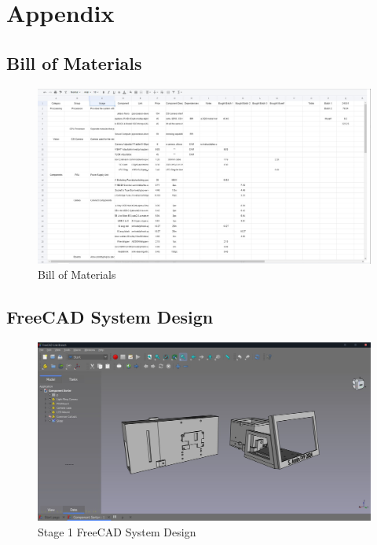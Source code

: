 \newpage
\onecolumn
\section{Appendix}
\subsection*{Bill of Materials}
\begin{figure}[H]
  \centering
  \includegraphics[width=\textwidth]{imgs/appendix/bom.jpg}
  \caption{Bill of Materials}
  \label{app:bom}
\end{figure}
\subsection*{FreeCAD System Design} 
\begin{figure}[H]
  \centering
  \includegraphics[width=\textwidth]{imgs/appendix/systemdesign.jpg}
  \caption{Stage 1 FreeCAD System Design}
  \label{app:freecad}
\end{figure}